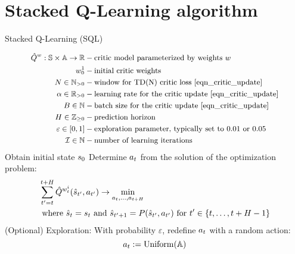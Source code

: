 \documentclass[12pt,twoside]{../../mitthesis}
\begin{document}
\section*{Stacked Q-Learning algorithm}
\begin{algorithm}
    \caption{Stacked Q-Learning (SQL)}
    \label{alg:my-alg}
    \begin{algorithmic}[1]
    \begin{equation*}
        \small
        \begin{aligned}
            \hat{Q}^w : \mathbb S \times \mathbb A \to {\mathbb{R}} &- \text{critic model parameterized by weights $w$} \\
            w_0^1 & - \text{initial critic weights} \\
            N \in {\mathbb{N}}_{>0} & - \text{window for TD(N) critic loss \eqref{eqn_critic_update}} \\
            \alpha \in {\mathbb{R}}_{>0}& - \text{learning rate for the critic update \eqref{eqn_critic_update}} \\
            B \in {\mathbb{N}} & - \text{batch size for the critic update \eqref{eqn_critic_update}} \\
            H \in {\mathbb{Z}}_{\geq 0} & - \text{prediction horizon} \\
            \varepsilon \in [0, 1] & - \text{exploration parameter, typically set to 0.01 or 0.05} \\
            \mathcal I \in {\mathbb{N}} & - \text{number of learning iterations}
        \end{aligned}
    \end{equation*}
        \STATE Obtain initial state $s_0$
            \STATE Determine $a_t$ from the solution of the optimization problem:
            $$
                \begin{aligned}
                &\sum_{t'=t}^{t+H} \hat Q^{w_t^i}(\hat{s}_{t'}, a_{t'}) \rightarrow \min_{a_t, \dots, a_{t+H}} \\
                &\text{ where } \hat{s}_t = s_t \text{ and } \hat{s}_{t' + 1} = P(\hat{s}_{t'}, a_{t'}) \text{ for } t' \in \{t, \ldots, t+H-1\}
            \end{aligned}
            $$
            \STATE (Optional) Exploration: With probability $\varepsilon$, redefine $a_t$ with a random action:
            $$
                a_t := \operatorname{Uniform}(\mathbb A) 
$$
\end{algorithmic}
\end{algorithm}
\end{document}
